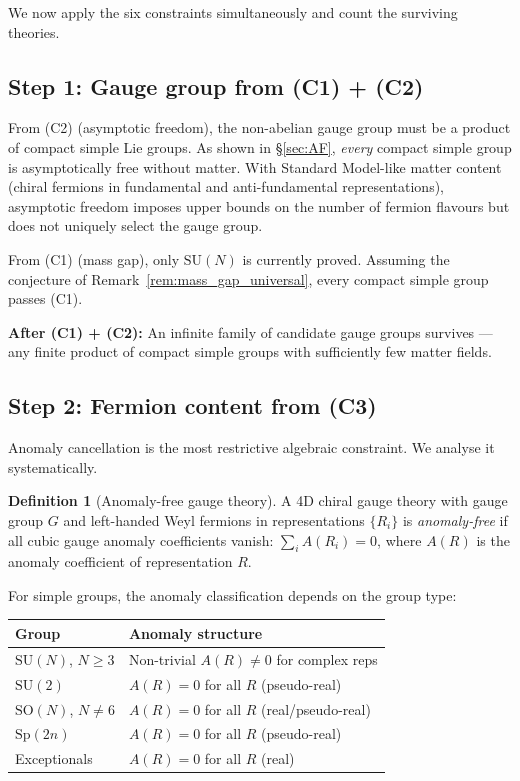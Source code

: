\documentclass[12pt]{article}
\theoremstyle{definition}
\newtheorem{definition}[theorem]{Definition}
\theoremstyle{remark}
\newcommand{\SU}{\mathrm{SU}}
\newcommand{\SO}{\mathrm{SO}}
\newcommand{\Sp}{\mathrm{Sp}}
\begin{document}
We now apply the six constraints simultaneously and count the
surviving theories.

\subsection{Step 1: Gauge group from (C1) + (C2)}

From (C2) (asymptotic freedom), the non-abelian gauge group must
be a product of compact simple Lie groups.  As shown in
\S\ref{sec:AF}, \emph{every} compact simple group is
asymptotically free without matter.  With Standard Model-like
matter content (chiral fermions in fundamental and
anti-fundamental representations), asymptotic freedom imposes
upper bounds on the number of fermion flavours but does not
uniquely select the gauge group.

From (C1) (mass gap), only $\SU(N)$ is currently proved.
Assuming the conjecture of Remark~\ref{rem:mass_gap_universal},
every compact simple group passes (C1).

\textbf{After (C1) + (C2):} An infinite family of candidate
gauge groups survives --- any finite product of compact simple
groups with sufficiently few matter fields.

\subsection{Step 2: Fermion content from (C3)}

Anomaly cancellation is the most restrictive algebraic
constraint.  We analyse it systematically.

\begin{definition}[Anomaly-free gauge theory]
A 4D chiral gauge theory with gauge group $G$ and
left-handed Weyl fermions in representations $\{R_i\}$ is
\emph{anomaly-free} if all cubic gauge anomaly coefficients
vanish:
$\sum_i A(R_i) = 0$, where $A(R)$ is the anomaly coefficient
of representation $R$.
\end{definition}

For simple groups, the anomaly classification depends on the
group type:

\begin{center}
\renewcommand{\arraystretch}{1.3}
\begin{tabular}{ll}
\toprule
Group & Anomaly structure \\
\midrule
$\SU(N)$, $N \geq 3$ & Non-trivial $A(R) \neq 0$ for complex reps \\
$\SU(2)$ & $A(R) = 0$ for all $R$ (pseudo-real) \\
$\SO(N)$, $N \neq 6$ & $A(R) = 0$ for all $R$ (real/pseudo-real) \\
$\Sp(2n)$ & $A(R) = 0$ for all $R$ (pseudo-real) \\
Exceptionals & $A(R) = 0$ for all $R$ (real) \\
\bottomrule
\end{tabular}
\end{center}
\end{document}
